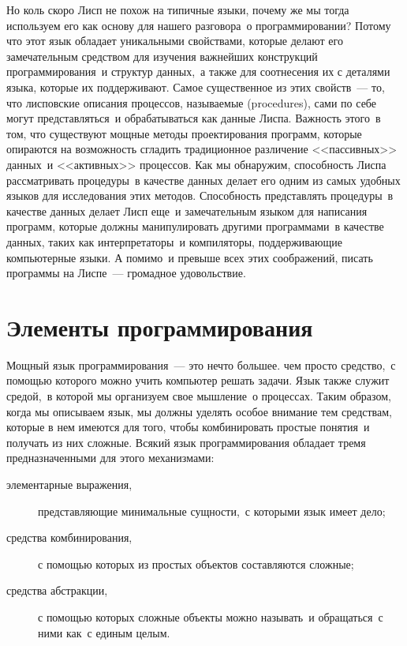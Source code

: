 Но коль скоро Лисп не похож на типичные языки, почему же мы тогда
используем его как основу для нашего разговора~о программировании?
Потому что этот язык обладает уникальными свойствами, которые делают
его замечательным средством для изучения важнейших конструкций
программирования~и структур данных,~а также для соотнесения их с
деталями языка, которые их поддерживают.  Самое существенное из этих свойств~--- то, что лисповские описания процессов, называемые
 (procedures), сами по себе могут
представляться~и 
обрабатываться как данные Лиспа.
Важность этого~в том, что существуют мощные методы проектирования
программ, которые опираются на возможность сгладить традиционное
различение <<пассивных>> данных~и <<активных>> процессов.
Как мы обнаружим, способность Лиспа рассматривать процедуры~в качестве 
данных делает его одним из самых удобных языков для исследования этих
методов.  Способность представлять процедуры~в качестве данных делает Лисп
еще~и замечательным языком для написания программ, которые должны
манипулировать другими программами~в качестве данных, таких как
интерпретаторы~и компиляторы, поддерживающие компьютерные языки.  А
помимо~и превыше всех этих соображений, писать программы на Лиспе~--- 
громадное удовольствие.

\section{Элементы программирования}
\label{THE-ELEMENTS-OF-PROGRAMMING}

Мощный язык программирования~--- это нечто большее. чем
просто средство,~с помощью которого можно учить компьютер решать
задачи.  Язык также служит средой,~в которой мы организуем свое
мышление~о процессах.  Таким образом, когда мы описываем язык, мы
должны уделять особое внимание тем средствам, которые в нем имеются
для того, чтобы комбинировать простые понятия~и получать
из них сложные.  Всякий язык программирования обладает тремя
предназначенными для этого механизмами:

      
\begin{description}

\item[элементарные выражения,]
представляющие минимальные сущности,~с 
которыми язык имеет дело;
{\sloppy

}%
\item[средства комбинирования,]
с помощью которых из простых объектов
составляются сложные;
\item[средства абстракции,]
с помощью которых сложные объекты можно называть~и 
обращаться~с ними как~с единым целым.

\sloppy
\end{description}

